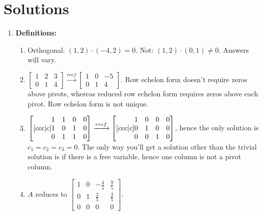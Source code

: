 
\section{Solutions}
{\small
\begin{multicols}{2}

\begin{enumerate}
	\item \textbf{Definitions:}
\begin{enumerate}
	\item Orthogonal: $(1,2)\cdot(-4,2)=0$. Not: $(1,2)\cdot(0,1)\neq 0$. Answers will vary.
	\item $
	\begin{bmatrix}
	1 &2 &3\\ 
	0&1&4
	\end{bmatrix}
	\xrightarrow{rref}
	\begin{bmatrix}
	1 &0 &-5\\ 
	0 &1 &4
	\end{bmatrix}
	$. Row echelon form doesn't require zeros above pivots, whereas reduced row echelon form requires zeros above each pivot. Row echelon form is not unique.
	\item  
	$
\begin{bmatrix}[ccc|c]
\begin{matrix} 1\\1\\0 \end{matrix}
&\begin{matrix} 1\\0\\1 \end{matrix}
&\begin{matrix} 0\\1\\1 \end{matrix}
&\begin{matrix} 0\\0\\0 \end{matrix}
\end{bmatrix}
\xrightarrow{rref}
\begin{bmatrix}[ccc|c]
\begin{matrix} 1\\0\\0 \end{matrix}
&\begin{matrix} 0\\1\\0 \end{matrix}
&\begin{matrix} 0\\0\\1 \end{matrix}
&\begin{matrix} 0\\0\\0 \end{matrix}
\end{bmatrix}
$, hence the only solution is $c_1=c_2=c_3=0$. The only way you'll get a solution other than the trivial solution is if there is a free variable, hence one column is not a pivot column.
	\item 
	$A$ reduces to $\begin{bmatrix}
 1 & 0 & -\frac{4}{5} & \frac{9}{5} \\
 0 & 1 & \frac{2}{5} & \frac{3}{5} \\
 0 & 0 & 0 & 0
	\end{bmatrix}$.  
	

\end{enumerate}
\end{enumerate}
\end{multicols}}
